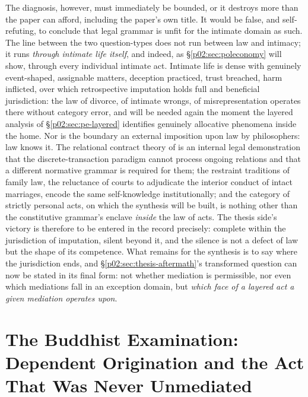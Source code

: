 The diagnosis, however, must immediately be bounded, or it destroys more than the paper can afford, including the paper's own title. It would be false, and self-refuting, to conclude that legal grammar is unfit for the intimate domain as such. The line between the two question-types does not run between law and intimacy; it runs \emph{through intimate life itself}, and indeed, as \S\ref{p02:sec:poleconomy} will show, through every individual intimate act. Intimate life is dense with genuinely event-shaped, assignable matters, deception practiced, trust breached, harm inflicted, over which retrospective imputation holds full and beneficial jurisdiction: the law of divorce, of intimate wrongs, of misrepresentation operates there without category error, and will be needed again the moment the layered analysis of \S\ref{p02:sec:pe-layered} identifies genuinely allocative phenomena inside the home. Nor is the boundary an external imposition upon law by philosophers: law knows it. The relational contract theory of \textcite{macneil1980new} is an internal legal demonstration that the discrete-transaction paradigm cannot process ongoing relations and that a different normative grammar is required for them; the restraint traditions of family law, the reluctance of courts to adjudicate the interior conduct of intact marriages, encode the same self-knowledge institutionally; and the category of strictly personal acts, on which the synthesis will be built, is nothing other than the constitutive grammar's enclave \emph{inside} the law of acts. The thesis side's victory is therefore to be entered in the record precisely: complete within the jurisdiction of imputation, silent beyond it, and the silence is not a defect of law but the shape of its competence. What remains for the synthesis is to say where the jurisdiction ends, and \S\ref{p02:sec:thesis-aftermath}'s transformed question can now be stated in its final form: not whether mediation is permissible, nor even which mediations fall in an exception domain, but \emph{which face of a layered act a given mediation operates upon}.

\section{The Buddhist Examination: Dependent Origination and the Act That Was Never Unmediated}
\label{p02:sec:buddhism}


